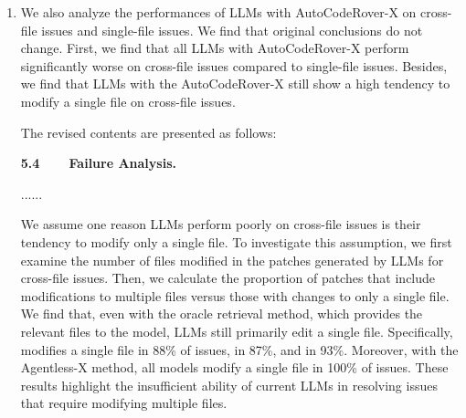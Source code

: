 \documentclass[12pt,american]{article}
\begin{document}
\begin{revresponse}
\begin{enumerate}
\begin{table}[h]
\end{table}

\newpage
\item We also analyze the performances of LLMs with AutoCodeRover-X on cross-file issues and single-file issues. We find that original conclusions do not change. First, we find that all LLMs with AutoCodeRover-X perform significantly worse on cross-file issues compared to single-file issues. Besides, we find that LLMs with the AutoCodeRover-X still show a high tendency to modify a single file on cross-file issues.

The revised contents are presented as follows:

\begin{changes}

\textbf{5.4~~~~Failure Analysis.}

......

We assume one reason LLMs perform poorly on cross-file issues is their tendency to modify only a single file. To investigate this assumption, we first examine the number of files modified in the patches generated by LLMs for cross-file issues. Then, we calculate the proportion of patches that include modifications to multiple files versus those with changes to only a single file. We find that, even with the oracle retrieval method, which provides the relevant files to the model, LLMs still primarily edit a single file. Specifically, \Claude modifies a single file in 88\% of issues, \GPT in 87\%, and \DeepSeek in 93\%. Moreover, with the Agentless-X method, all models modify a single file in 100\% of issues.   These results highlight the insufficient ability of current LLMs in resolving issues that require modifying multiple files.



\end{changes}
\end{enumerate}
\end{revresponse}
\end{document}
